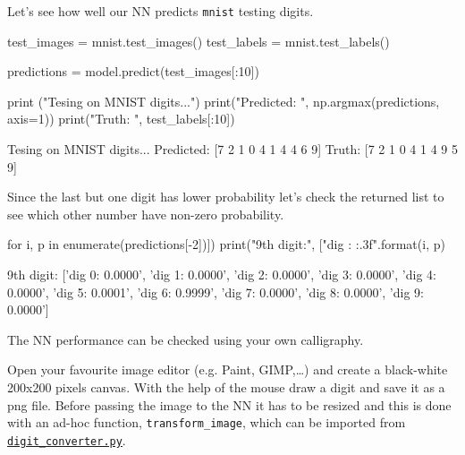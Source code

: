 Let's see how well our NN predicts \texttt{mnist} testing digits.

\begin{ipython}
test_images = mnist.test_images()
test_labels = mnist.test_labels()

predictions = model.predict(test_images[:10])

print ("Tesing on MNIST digits...")
print("Predicted: ", np.argmax(predictions, axis=1)) 
print("Truth:     ", test_labels[:10])
\end{ipython}
\begin{ioutput}
Tesing on MNIST digits...
Predicted:  [7 2 1 0 4 1 4 4 6 9]
Truth: [7 2 1 0 4 1 4 9 5 9]
\end{ioutput}

Since the last but one digit has lower probability let's check the returned list to see which other number have non-zero probability.

\begin{ipython}
for i, p in enumerate(predictions[-2])])
    print("9th digit:", ["dig {}: {:.3f}".format(i, p)
\end{ipython}
\begin{ioutput}
9th digit: ['dig 0: 0.0000', 'dig 1: 0.0000', 'dig 2: 0.0000', 'dig 3: 0.0000', 
            'dig 4: 0.0000', 'dig 5: 0.0001', 'dig 6: 0.9999', 'dig 7: 0.0000', 
            'dig 8: 0.0000', 'dig 9: 0.0000']
\end{ioutput}


The NN performance can be checked using your own calligraphy. 

Open your favourite image editor (e.g. Paint, GIMP,\ldots) and create a black-white 200x200 pixels canvas. With the help of the mouse draw a digit and save it as a png file.
Before passing the image to the NN it has to be resized and this is done with an ad-hoc function, \texttt{transform\_image}, which can be imported from \href{https://raw.githubusercontent.com/matteosan1/finance_course/develop/libro/input_files/digit_converter.py}{\texttt{digit\_converter.py}}.

